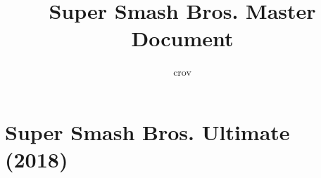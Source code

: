 \documentclass[a4paper]{article}
\title{Super Smash Bros. Master Document}
\author{crov}
\begin{document}
	
	\maketitle\thispagestyle{empty}
	
	\newpage
	
	\tableofcontents
	
	\newpage
	
	\section{Super Smash Bros. Ultimate (2018)}
	
	
	
	
	
\end{document}
